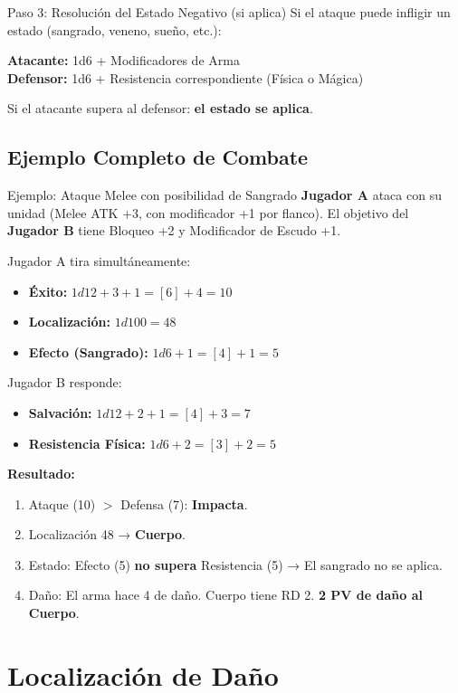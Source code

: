 \begin{reglaespecial}{Paso 3: Resolución del Estado Negativo (si aplica)}
Si el ataque puede infligir un estado (sangrado, veneno, sueño, etc.):

\textbf{Atacante:} 1d6 + Modificadores de Arma\\
\textbf{Defensor:} 1d6 + Resistencia correspondiente (Física o Mágica)

Si el atacante supera al defensor: \textbf{el estado se aplica}.
\end{reglaespecial}

\subsection*{Ejemplo Completo de Combate}

\begin{ejemplo}{Ejemplo: Ataque Melee con posibilidad de Sangrado}
\textbf{Jugador A} ataca con su unidad (Melee ATK +3, con modificador +1 por flanco). El objetivo del \textbf{Jugador B} tiene Bloqueo +2 y Modificador de Escudo +1.

Jugador A tira simultáneamente:
\begin{itemize}
    \item \textbf{Éxito:} $1d12 + 3 + 1 = [6] + 4 = 10$
    \item \textbf{Localización:} $1d100 = 48$
    \item \textbf{Efecto (Sangrado):} $1d6 + 1 = [4] + 1 = 5$
\end{itemize}
Jugador B responde:
\begin{itemize}
    \item \textbf{Salvación:} $1d12 + 2 + 1 = [4] + 3 = 7$
    \item \textbf{Resistencia Física:} $1d6 + 2 = [3] + 2 = 5$
\end{itemize}
\textbf{Resultado:}
\begin{enumerate}
    \item Ataque (10) $>$ Defensa (7): \textbf{Impacta}.
    \item Localización 48 → \textbf{Cuerpo}.
    \item Estado: Efecto (5) \textbf{no supera} Resistencia (5) → El sangrado no se aplica.
    \item Daño: El arma hace 4 de daño. Cuerpo tiene RD 2. \textbf{2 PV de daño al Cuerpo}.
\end{enumerate}
\end{ejemplo}

\section{Localización de Daño}

